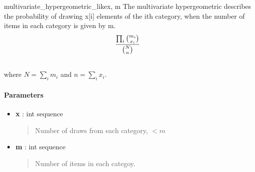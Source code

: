 \hypertarget{pymc.distributions.multivariate_hypergeometric_like}{}\begin{funcdesc}{multivariate\_hypergeometric\_like}{x, m}
The multivariate hypergeometric describes the probability of drawing x{[}i{]}
elements of the ith category, when the number of items in each category is
given by m.
\begin{gather}
\begin{split}\frac{\prod_i \binom{m_i}{x_i}}{\binom{N}{n}}\end{split}\notag\\\begin{split}\end{split}\notag
\end{gather}
where $N = \sum_i m_i$ and $n = \sum_i x_i$.
\paragraph{Parameters}\begin{itemize}

\item[] \textbf{x} : int sequence
\begin{quote}

Number of draws from each category, $< m$
\end{quote}

\item[] \textbf{m} : int sequence
\begin{quote}

Number of items in each categoy.
\end{quote}
\end{itemize}
\end{funcdesc}

